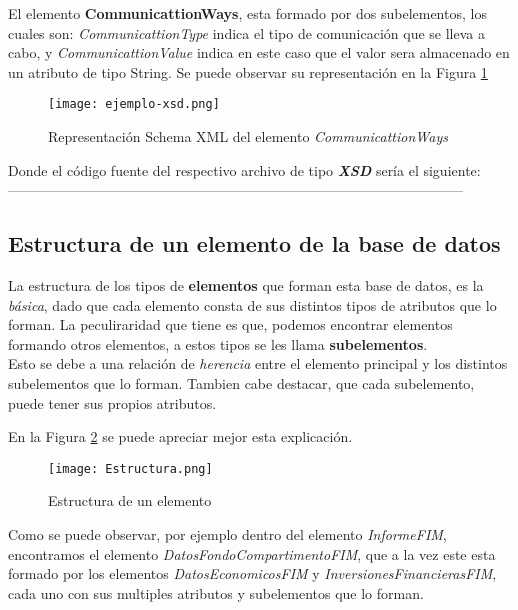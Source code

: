 \documentclass[11pt]{diazessay} %
\begin{document}
El elemento \textbf{CommunicattionWays}, esta formado por dos subelementos, los cuales son: \textit{CommunicattionType} indica el tipo de comunicación que se lleva a cabo, y \textit{CommunicattionValue} indica en este caso que el valor sera almacenado en un atributo de tipo String. Se puede observar su representación en la Figura \ref{fig:ejemplo_xsd}\\

\begin{figure}[h!]
	\texttt{[image: ejemplo-xsd.png]}
	\caption{Representación Schema XML del elemento \textit{CommunicattionWays}}
	\label{fig:ejemplo_xsd}
\end{figure}


Donde el código fuente del respectivo archivo de tipo \textit{\textbf{XSD}} sería el siguiente:\\

 

--------------------------------------------------------------------------------------------------\\

\subsection*{Estructura de un elemento de la base de datos}
La estructura de los tipos de \textbf{elementos} que forman esta base de datos, es la \textit{básica}, dado que cada elemento consta de sus distintos tipos de atributos que lo forman. La peculiraridad que tiene es que, podemos encontrar elementos formando otros elementos, a estos tipos se les llama \textbf{subelementos}.\\
Esto se debe a una relación de \textit{herencia} entre el elemento principal y los distintos subelementos que lo forman. Tambien cabe destacar, que cada subelemento, puede tener sus propios atributos.

En la Figura \ref{fig:estructura} se puede apreciar mejor esta explicación.

\begin{figure}[h!]
	\centering
	\texttt{[image: Estructura.png]}
	\caption{Estructura de un elemento}
	\label{fig:estructura}
\end{figure}


Como se puede observar, por ejemplo dentro del elemento \textit{InformeFIM}, encontramos el elemento \textit{DatosFondoCompartimentoFIM}, que a la vez este esta formado por los elementos \textit{DatosEconomicosFIM} y \textit{InversionesFinancierasFIM}, cada uno con sus multiples atributos y subelementos que lo forman.
\end{document}
